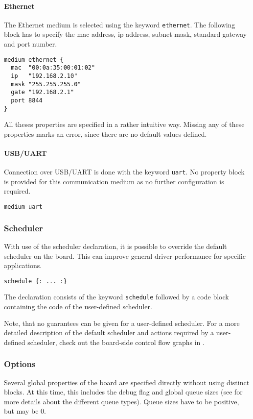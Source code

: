 \documentclass{report}
\begin{document}
\paragraph{Ethernet}
The Ethernet medium is selected using the keyword \texttt{ethernet}. The following block has to specify the mac address, ip address, subnet mask, standard gateway and port number.

\begin{lstlisting}[language=bdl]
medium ethernet {
  mac  "00:0a:35:00:01:02"
  ip   "192.168.2.10"
  mask "255.255.255.0"
  gate "192.168.2.1"
  port 8844
}
\end{lstlisting}

All theses properties are specified in a rather intuitive way. Missing any of these properties marks an error, since there are no default values defined.

\paragraph{USB/UART}
Connection over USB/UART is done with the keyword \texttt{uart}. No property block is provided for this communication medium as no further configuration is required.

\begin{lstlisting}[language=bdl]
medium uart
\end{lstlisting}

\subsubsection{Scheduler}
With use of the scheduler declaration, it is possible to override the default scheduler on the board. This can improve general driver performance for specific applications.

\begin{lstlisting}[language=bdl]
schedule {: ... :}
\end{lstlisting}

The declaration consists of the keyword \texttt{schedule} followed by a code block containing the code of the user-defined scheduler.

Note, that no guarantees can be given for a user-defined scheduler. For a more detailed description of the default scheduler and actions required by a user-defined scheduler, check out the board-side control flow graphs in .

\subsubsection{Options}
Several global properties of the board are specified directly without using distinct blocks. At this time, this includes the debug flag and global queue sizes (see  for more details about the different queue types). Queue sizes have to be positive, but may be 0.
\end{document}
